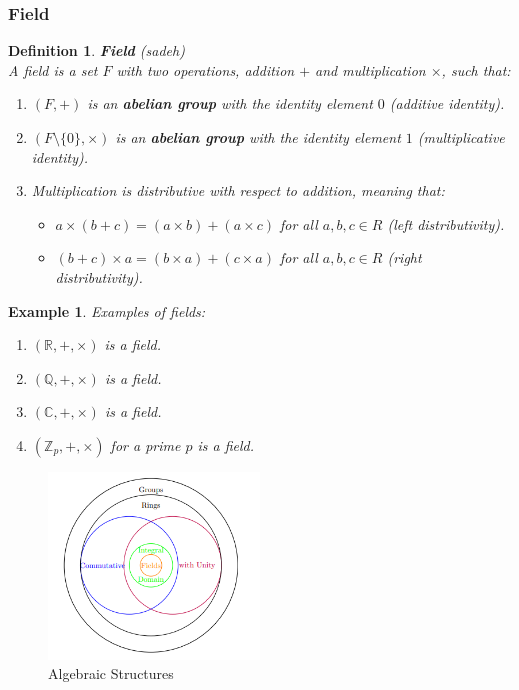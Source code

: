 \documentclass[11pt]{book} %
\newtheorem{definition}{Definition}[section]
\newtheorem*{example*}{Example}
\begin{document}
\subsubsection{Field}
\begin{definition}{\textbf{Field} (sadeh)} \\
    A field is a set \(F\) with two operations, addition \(+\) and multiplication \(\times\), such that:
    \begin{enumerate}
        \item \( (F, +) \) is an \textbf{abelian group} with the identity element \(0\) (additive identity).
        \item \( (F \setminus \{0\}, \times) \) is an \textbf{abelian group} with the identity element \(1\) (multiplicative identity).
        \item Multiplication is distributive with respect to addition, meaning that:
        \begin{itemize}
            \item \(a \times (b + c) = (a \times b) + (a \times c)\) for all \(a, b, c \in R\) (left distributivity).
            \item \((b + c) \times a = (b \times a) + (c \times a)\) for all \(a, b, c \in R\) (right distributivity).
        \end{itemize}
    \end{enumerate}
\end{definition}

\begin{example*}
Examples of fields:
\begin{enumerate}
\item \( (\mathbb{R}, +, \times) \) is a field.
\item \( (\mathbb{Q}, +, \times) \) is a field.
\item \( (\mathbb{C}, +, \times) \) is a field.
\item \( (\mathbb{Z}_p, +, \times) \) for a prime \(p\) is a field.
\end{enumerate}
\end{example*}

\begin{figure}
    \centering
    \includegraphics[width=0.5\textwidth]{Figs/algebric_structures.png}
    \caption{Algebraic Structures}
\end{figure}
\end{document}
